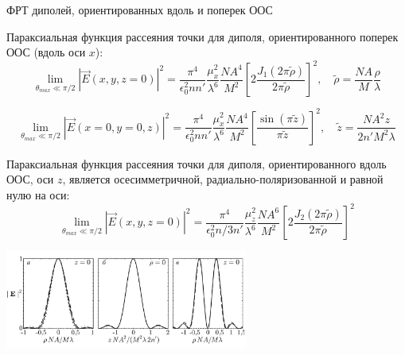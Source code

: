 \documentclass[9pt, compress, xcolor=table]{beamer}
\begin{document}
\begin{frame}{ФРТ диполей, ориентированных вдоль и поперек ООС}

{\small Параксиальная функция рассеяния точки для
диполя, ориентированного \textcolor{red!50!black}{поперек ООС (вдоль оси $x$)}:}
\begin{equation*}
\lim_{\theta_{max} \ll \pi/2} |\vec E(x,y,z =0)|^2
= \frac{\pi^4}{\epsilon_0^2 n n'} \frac{\mu_x^2}{\lambda^6} \frac{NA^4}{M^2}
\left[2 \frac{J_1 (2 \pi \tilde{\rho})}{2 \pi \tilde{\rho}}\right]^2,
\quad \tilde{\rho} = \frac{NA}{M}\frac{\rho}{\lambda}
\end{equation*}

\begin{equation*}
\lim_{\theta_{max} \ll \pi/2} |\vec E(x = 0, y = 0, z)|^2 = \frac{\pi^4}{\epsilon_0^2 n n'} \frac{\mu_x^2}{\lambda^6}
\frac{NA^4}{M^2}\left[\frac{\sin (\pi \tilde{z})}{\pi \tilde{z}}\right]^2, \quad \tilde{z} = \frac{NA^2 z}{2n'M^2 \lambda}
\end{equation*}

{\small Параксиальная функция рассеяния точки для
диполя, ориентированного \textcolor{blue!50!black}{вдоль ООС, оси $z$,} является осесимметричной, радиально-поляризованной и равной нулю на оси:}
\begin{equation*}
\lim_{\theta_{max} \ll \pi/2} |\vec E(x,y,z =0)|^2 = \frac{\pi^4}{\epsilon_0^2 n/3 n'} \frac{\mu_z^2}{\lambda^6} \frac{NA^6}{M^2}
\left[2 \frac{J_2 (2 \pi \tilde{\rho})}{2 \pi \tilde{\rho}}\right]^2
\end{equation*}
\begin{center}
\includegraphics[width=0.6\textwidth]{fig4_02}
\end{center}

\end{frame}
\end{document}
